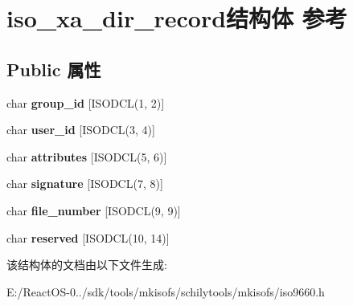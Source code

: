 \hypertarget{structiso__xa__dir__record}{}\section{iso\+\_\+xa\+\_\+dir\+\_\+record结构体 参考}
\label{structiso__xa__dir__record}
\subsection*{Public 属性}
\begin{DoxyCompactItemize}
\item 
\mbox{\label{structiso__xa__dir__record_a542b5b38bdbc9e34c80c2b511f64b6dd}} 
char {\bfseries group\+\_\+id} \mbox{[}I\+S\+O\+D\+CL(1, 2)\mbox{]}
\item 
\mbox{\label{structiso__xa__dir__record_a2f0f8e65b0d4e135945b11a7274c4442}} 
char {\bfseries user\+\_\+id} \mbox{[}I\+S\+O\+D\+CL(3, 4)\mbox{]}
\item 
\mbox{\label{structiso__xa__dir__record_a0c20503a8db502213f73e6193e1aed13}} 
char {\bfseries attributes} \mbox{[}I\+S\+O\+D\+CL(5, 6)\mbox{]}
\item 
\mbox{\label{structiso__xa__dir__record_addabe26ff0ce71da791b43e1c803f5be}} 
char {\bfseries signature} \mbox{[}I\+S\+O\+D\+CL(7, 8)\mbox{]}
\item 
\mbox{\label{structiso__xa__dir__record_a6fd3b024134c65e4f181bfd5a00b2fa2}} 
char {\bfseries file\+\_\+number} \mbox{[}I\+S\+O\+D\+CL(9, 9)\mbox{]}
\item 
\mbox{\label{structiso__xa__dir__record_a0c2b588b53164066626941414d458c8b}} 
char {\bfseries reserved} \mbox{[}I\+S\+O\+D\+CL(10, 14)\mbox{]}
\end{DoxyCompactItemize}


该结构体的文档由以下文件生成\+:\begin{DoxyCompactItemize}
\item 
E\+:/\+React\+O\+S-\/0../sdk/tools/mkisofs/schilytools/mkisofs/iso9660.\+h\end{DoxyCompactItemize}
